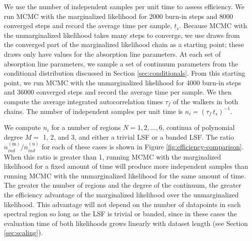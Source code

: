 \documentclass[manuscript]{aastex62}
\begin{document}
{We use the number of independent samples per unit time to assess efficiency.
We run MCMC with the marginalized likelihood for 2000 burn-in steps and 8000 converged steps and record the average time per sample, $t_s$.
Because MCMC with the unmarginalized likelihood takes many steps to converge, we use draws from the converged part of the marginalized likelihood chain as a starting point; these draws only have values for the absorption line parameters.
At each set of absorption line parameters, we sample a set of continuum parameters from the conditional distribution discussed in Section \ref{sec:conditionals}.
From this starting point, we run MCMC with the unmarginalized likelihood for 4000 burn-in steps and 36000 converged steps and record the average time per sample.
We then compute the average integrated autocorrelation times $\tau_f$ of the walkers in both chains.
The number of independent samples per unit time is $n_i = \left(\tau_f \, t_s \right)^{-1}$.

We compute $n_i$ for a number of regions $N = 1, 2, \ldots, 6$, continua of polynomial degree $M=$ 1, 2, and 3, and either a trivial LSF or a banded LSF.
The ratio $n_{ind}^{(\text{m})} / n_{ind}^{(\text{u})}$ for each of these cases is shown in Figure \ref{fig:efficiency-comparison}.
When this ratio is greater than 1, running MCMC with the marginalized likelihood for a fixed amount of time will produce more independent samples than running MCMC with the unmarginalized likelihood for the same amount of time.
The greater the number of regions and the degree of the continuum, the greater the efficiency advantage of the marginalized likelihood over the unmarginalized likelihood.
This advantage will not depend on the number of datapoints in each spectral region so long as the LSF is trivial or banded, since in these cases the evaluation time of both likelihoods grows linearly with dataset length (see Section \ref{sec:scaling}).
}


%
\end{document}
